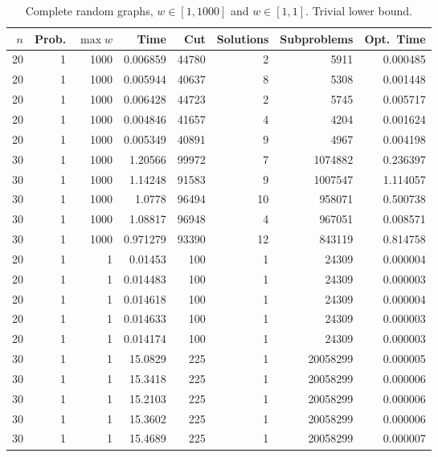 \documentclass[a4paper,11pt]{article}
\begin{document}
\begin{table}
\begin{center}
\begin{tabular}{|rrr|r|r|rr|r|}
\hline
$n$ & Prob. & $\max w$ & Time & Cut & Solutions & Subproblems & Opt.\ Time \\
\hline
20 & 1 & 1000 & 0.006859 & 44780 & 2 & 5911 & 0.000485 \\
20 & 1 & 1000 & 0.005944 & 40637 & 8 & 5308 & 0.001448 \\
20 & 1 & 1000 & 0.006428 & 44723 & 2 & 5745 & 0.005717 \\
20 & 1 & 1000 & 0.004846 & 41657 & 4 & 4204 & 0.001624 \\
20 & 1 & 1000 & 0.005349 & 40891 & 9 & 4967 & 0.004198 \\
30 & 1 & 1000 & 1.20566 & 99972 & 7 & 1074882 & 0.236397 \\
30 & 1 & 1000 & 1.14248 & 91583 & 9 & 1007547 & 1.114057 \\
30 & 1 & 1000 & 1.0778 & 96494 & 10 & 958071 & 0.500738 \\
30 & 1 & 1000 & 1.08817 & 96948 & 4 & 967051 & 0.008571 \\
30 & 1 & 1000 & 0.971279 & 93390 & 12 & 843119 & 0.814758 \\
\hline
20 & 1 & 1 & 0.01453 & 100 & 1 & 24309 & 0.000004 \\
20 & 1 & 1 & 0.014483 & 100 & 1 & 24309 & 0.000003 \\
20 & 1 & 1 & 0.014618 & 100 & 1 & 24309 & 0.000004 \\
20 & 1 & 1 & 0.014633 & 100 & 1 & 24309 & 0.000003 \\
20 & 1 & 1 & 0.014174 & 100 & 1 & 24309 & 0.000003 \\
30 & 1 & 1 & 15.0829 & 225 & 1 & 20058299 & 0.000005 \\
30 & 1 & 1 & 15.3418 & 225 & 1 & 20058299 & 0.000006 \\
30 & 1 & 1 & 15.2103 & 225 & 1 & 20058299 & 0.000006 \\
30 & 1 & 1 & 15.3602 & 225 & 1 & 20058299 & 0.000006 \\
30 & 1 & 1 & 15.4689 & 225 & 1 & 20058299 & 0.000007 \\
\hline
\end{tabular}
\end{center}
\caption{Complete random graphs, $w\in[1,1000]$ and
  $w\in[1,1]$. Trivial lower bound.}
\label{tab:complete-norebal}
\end{table}
\end{document}
